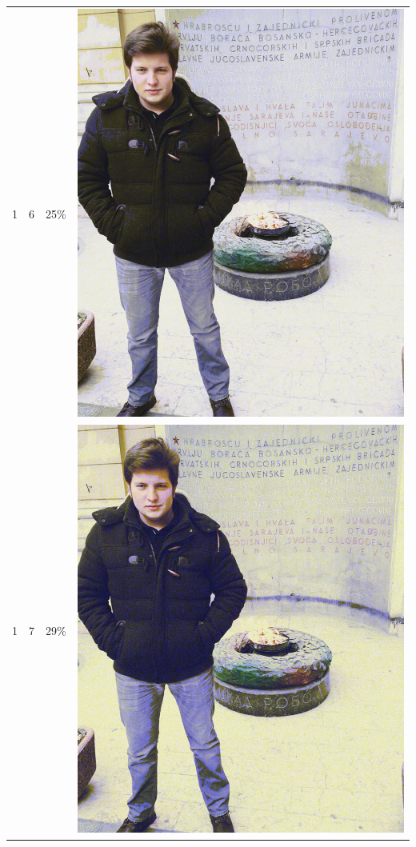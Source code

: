 \documentclass[times, utf8, seminar, numeric]{fer}
\begin{document}
\begin{center}
\begin{longtable}{|c|c|c|c|}
1 & 6 &25\% & \includegraphics[scale=0.3]{../benchmark_results/pattern/1_components-6_bits.png} \\
1 & 7 &29\% & \includegraphics[scale=0.3]{../benchmark_results/pattern/1_components-7_bits.png} \\

\end{longtable}
\end{center}
\end{document}
